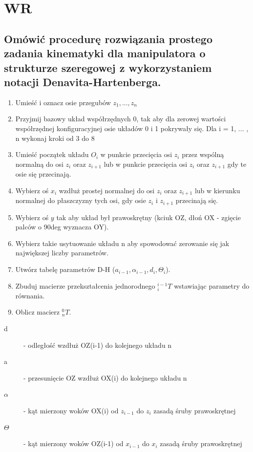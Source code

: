 \section{WR}
\subsection{Omówić procedurę rozwiązania prostego zadania kinematyki dla manipulatora o strukturze szeregowej z wykorzystaniem notacji Denavita-Hartenberga.}
\label{pyt:22}
\begin{enumerate}
    \item Umieść i oznacz osie przegubów $z_1, ..., z_n$
    \item Przyjmij bazowy układ współrzędnych {0}, tak aby dla zerowej wartości współrzędnej konfiguracyjnej osie układów {0} i {1} pokrywały się. Dla i = 1, ... , n wykonaj kroki od 3 do 8
    \item Umieść początek układu $O_i$ w punkcie przecięcia osi $z_i$ przez wspólną normalną do osi $z_i$ oraz $z_{i+1}$ lub w punkcie przecięcia osi $z_i$ oraz $z_{i+1}$ gdy te osie się przecinają.
    \item Wybierz oś $x_i$ wzdłuż prostej normalnej do osi $z_i$ oraz $z_{i+1}$ lub w kierunku normalnej do płaszczyzny tych osi, gdy osie $z_i$ i $z_{i+1}$ przecinają się.
    \item Wybierz oś $y$ tak aby układ był prawoskrętny (kciuk OZ, dłoń OX - zgięcie palców o 90deg wyznacza OY).
    \item Wybierz takie usytuowanie układu {n} aby spowodować zerowanie się jak największej liczby parametrów.
    \item Utwórz tabelę parametrów D-H ($a_{i-1},\alpha_{i-1},d_i,\Theta_i$).
    \item Zbuduj macierze przekształcenia jednorodnego $^{i-1}_iT$ wstawiając parametry do równania.
    \item Oblicz macierz $^0_nT$.
\end{enumerate}

\begin{description}
    \item[d] - odległość wzdłuż OZ(i-1) do kolejnego układu {n}
    \item[a] - przesunięcie OZ wzdłuż OX(i) do kolejnego układu {n}
    \item[$\alpha$] - kąt mierzony woków OX(i) od $z_{i-1}$ do $z_i$ zasadą śruby prawoskrętnej
    \item [$\Theta$] - kąt mierzony woków OZ(i-1) od $x_{i-1}$ do $x_i$ zasadą śruby prawoskrętnej
\end{description}


